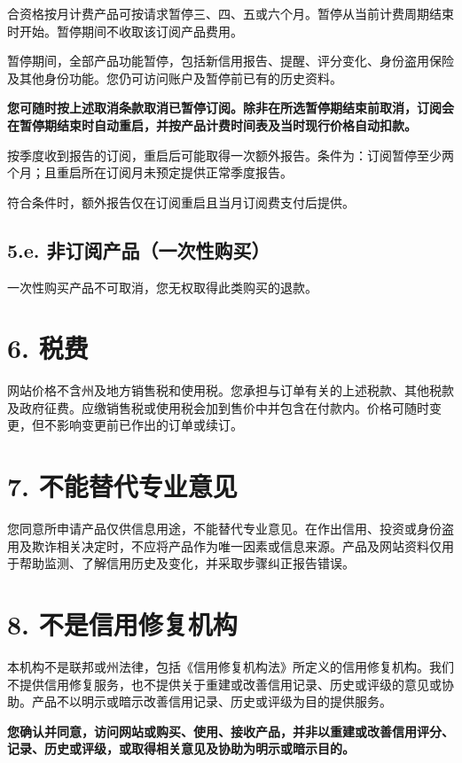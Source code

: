 \documentclass[UTF8,fontset=none,11pt,a4paper]{ctexart}
\begin{document}
合资格按月计费产品可按请求暂停三、四、五或六个月。暂停从当前计费周期结束时开始。暂停期间不收取该订阅\allowbreak\mbox{产品费用。}


暂停期间，全部产品功能暂停，包括新信用报告、提醒、评分变化、身份盗用保险及其他身份功能。您仍可访问账户及暂停前已有的\allowbreak\mbox{历史资料。}


\textbf{您可随时按上述取消条款取消已暂停订阅。除非在所选暂停期结束前取消，订阅会在暂停期结束时自动重启，并按产品计费时间表及当时现行价格自动扣款。}


按季度收到报告的订阅，重启后可能取得一次额外报告。条件为：订阅暂停至少两个月；且重启所在订阅月未预定提供正常\allowbreak\mbox{季度报告。}


符合条件时，额外报告仅在订阅重启且当月订阅费支\allowbreak\mbox{付后提供。}


\subsection*{5.e. 非订阅产品（一次性购买）}
一次性购买产品不可取消，您无权取得此类购\allowbreak\mbox{买的退款。}


\section*{6. 税费}
网站价格不含州及地方销售税和使用税。您承担与订单有关的上述税款、其他税款及政府征费。应缴销售税或使用税会加到售价中并包含在付款内。价格可随时变更，但不影响变更前已作出的订\allowbreak\mbox{单或续订。}


\section*{7. 不能替代专业意见}
您同意所申请产品仅供信息用途，不能替代专业意见。在作出信用、投资或身份盗用及欺诈相关决定时，不应将产品作为唯一因素或信息来源。产品及网站资料仅用于帮助监测、了解信用历史及变化，并采取步骤纠正\allowbreak\mbox{报告错误。}


\section*{8. 不是信用修复机构}
本机构不是联邦或州法律，包括《信用修复机构法》所定义的信用修复机构。我们不提供信用修复服务，也不提供关于重建或改善信用记录、历史或评级的意见或协助。产品不以明示或暗示改善信用记录、历史或评级为目的\allowbreak\mbox{提供服务。}


\textbf{您确认并同意，访问网站或购买、使用、接收产品，并非以重建或改善信用评分、记录、历史或评级，或取得相关意见及协助为明示或暗示目的。}
\end{document}
